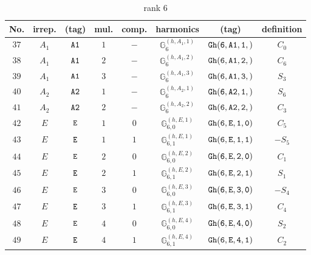 \documentclass[fleqn,8pt]{jsarticle}
\begin{document}
\begin{table}[ht!]
\begin{center}
\caption{rank 6}
\renewcommand{\arraystretch}{1.3}
\begin{tabular}{cccccccc} \hline \hline
No. & irrep. & (tag) & mul. & comp. & harmonics & (tag) & definition \\ \hline
$ 37 $ & $ A_{1} $ & $ {\tt A1} $ & $ 1 $ & $ - $ & $ \mathbb{G}_{6}^{(h,A_{1},1)} $ & $ {\tt Gh(6,A1,1,)} $ & $ C_{0} $ \\
$ 38 $ & $ A_{1} $ & $ {\tt A1} $ & $ 2 $ & $ - $ & $ \mathbb{G}_{6}^{(h,A_{1},2)} $ & $ {\tt Gh(6,A1,2,)} $ & $ C_{6} $ \\
$ 39 $ & $ A_{1} $ & $ {\tt A1} $ & $ 3 $ & $ - $ & $ \mathbb{G}_{6}^{(h,A_{1},3)} $ & $ {\tt Gh(6,A1,3,)} $ & $ S_{3} $ \\
$ 40 $ & $ A_{2} $ & $ {\tt A2} $ & $ 1 $ & $ - $ & $ \mathbb{G}_{6}^{(h,A_{2},1)} $ & $ {\tt Gh(6,A2,1,)} $ & $ S_{6} $ \\
$ 41 $ & $ A_{2} $ & $ {\tt A2} $ & $ 2 $ & $ - $ & $ \mathbb{G}_{6}^{(h,A_{2},2)} $ & $ {\tt Gh(6,A2,2,)} $ & $ C_{3} $ \\
$ 42 $ & $ E $ & $ {\tt E} $ & $ 1 $ & $ 0 $ & $ \mathbb{G}_{6,0}^{(h,E,1)} $ & $ {\tt Gh(6,E,1,0)} $ & $ C_{5} $ \\
$ 43 $ & $ E $ & $ {\tt E} $ & $ 1 $ & $ 1 $ & $ \mathbb{G}_{6,1}^{(h,E,1)} $ & $ {\tt Gh(6,E,1,1)} $ & $ - S_{5} $ \\
$ 44 $ & $ E $ & $ {\tt E} $ & $ 2 $ & $ 0 $ & $ \mathbb{G}_{6,0}^{(h,E,2)} $ & $ {\tt Gh(6,E,2,0)} $ & $ C_{1} $ \\
$ 45 $ & $ E $ & $ {\tt E} $ & $ 2 $ & $ 1 $ & $ \mathbb{G}_{6,1}^{(h,E,2)} $ & $ {\tt Gh(6,E,2,1)} $ & $ S_{1} $ \\
$ 46 $ & $ E $ & $ {\tt E} $ & $ 3 $ & $ 0 $ & $ \mathbb{G}_{6,0}^{(h,E,3)} $ & $ {\tt Gh(6,E,3,0)} $ & $ - S_{4} $ \\
$ 47 $ & $ E $ & $ {\tt E} $ & $ 3 $ & $ 1 $ & $ \mathbb{G}_{6,1}^{(h,E,3)} $ & $ {\tt Gh(6,E,3,1)} $ & $ C_{4} $ \\
$ 48 $ & $ E $ & $ {\tt E} $ & $ 4 $ & $ 0 $ & $ \mathbb{G}_{6,0}^{(h,E,4)} $ & $ {\tt Gh(6,E,4,0)} $ & $ S_{2} $ \\
$ 49 $ & $ E $ & $ {\tt E} $ & $ 4 $ & $ 1 $ & $ \mathbb{G}_{6,1}^{(h,E,4)} $ & $ {\tt Gh(6,E,4,1)} $ & $ C_{2} $ \\
 \hline \hline
\end{tabular}
\end{center}
\end{table}
\end{document}
